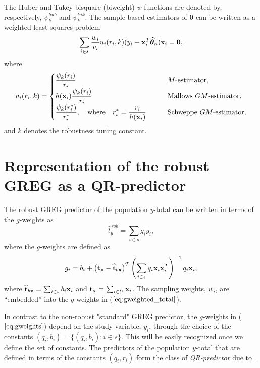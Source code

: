 \documentclass[a4paper,oneside,11pt,DIV=12]{scrartcl}
\theoremstyle{remark}
\begin{document}
\noindent The Huber and Tukey bisquare (biweight) $\psi$-functions are denoted
by, respectively, $\psi_k^{hub}$ and $\psi_k^{tuk}$. The sample-based
estimators of $\boldsymbol \theta$ can be written as a weighted least squares
problem
\begin{equation*}
    \sum_{i \in s} \frac{w_i}{v_i} u_i(r_i,k) (y_i - \bold x_i^T
    \widehat{\boldsymbol \theta}_n) \bold x_i = \bold 0,
\end{equation*}
\noindent where
\begin{equation}\label{eq:ui}
    u_i(r_i,k) = \begin{cases}
        \displaystyle{\frac{\psi_k(r_i)}{r_i}} & \qquad \text{$M$-estimator},\\
        h(\bold x_i)\displaystyle{\frac{\psi_k(r_i)}{r_i}} &
            \qquad \text{Mallows $GM$-estimator},\\
        \displaystyle{\frac{\psi_k(r_i^*)}{r_i^*}}, \quad \text{where} \quad
            r_i^* = \frac{r_i}{h(\bold x_i)} & \qquad \text{Schweppe $GM$-estimator},
    \end{cases}
\end{equation}
\noindent and $k$ denotes the robustness tuning constant.

\section{Representation of the robust GREG as a QR-predictor}
The robust GREG predictor of the population $y$-total can be written in terms
of the $g$-weights \citep[see e.g.][Chapter 6]{sarndal_swensson_etal_1992} as
\begin{equation}\label{eq:gweighted_total}
	\widehat{t}_{y}^{\,rob} = \sum_{i \in s}g_i y_i,
\end{equation}
\noindent where the $g$-weights are defined as \citep{duchesne_1999}
\begin{equation}\label{eq:gweights}
    g_i = b_i + \big(\bold t_{\bold x} - \widehat{\bold t}_{b\bold x}\big)^T
    \left(\sum_{i \in s}q_i \bold x_i \bold x_i^T\right)^{-1}q_i\bold x_i,
\end{equation}
\noindent where $\widehat{\bold t}_{b\bold x} = \sum_{i \in s}b_i \bold x_i$
and $\bold t_{\bold x} = \sum_{i \in U}\bold x_i$. The sampling weights, $w_i$,
are ``embedded'' into the $g$-weights in ($\ref{eq:gweighted_total}$).

In contrast to the non-robust "standard" GREG predictor, the $g$-weights in
($\ref{eq:gweights}$) depend on the study variable, $y_i$, through the choice
of the constants $(q_i, b_i) = \{(q_i,b_i): i \in s\}$. This will be easily
recognized once we define the set of constants. The predictors of the
population $y$-total that are defined in terms of the constants $(q_i,r_i)$
form the class of \emph{QR-predictor} due to \citep{wright_1983}.
\end{document}
